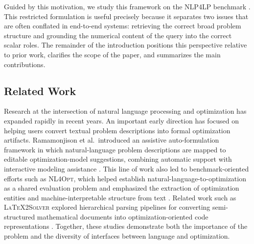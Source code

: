 \documentclass[pdflatex,sn-basic,Numbered]{sn-jnl}
\begin{document}
Guided by this motivation, we study this framework on the \textsc{NLP4LP} benchmark \cite{nlp4lp_dataset,ahmaditeshnizi2024optimus_icml}. This restricted formulation is useful precisely because it separates two issues that are often conflated in end-to-end systems: retrieving the correct broad problem structure and grounding the numerical content of the query into the correct scalar roles. The remainder of the introduction positions this perspective relative to prior work, clarifies the scope of the paper, and summarizes the main contributions.

\subsection{Related Work}
\label{subsec:intro_related}

Research at the intersection of natural language processing and optimization has expanded rapidly in recent years. An important early direction has focused on helping users convert textual problem descriptions into formal optimization artifacts. Ramamonjison et al.\ introduced an assistive auto-formulation framework in which natural-language problem descriptions are mapped to editable optimization-model suggestions, combining automatic support with interactive modeling assistance \cite{ramamonjison2022autoformulation}. This line of work also led to benchmark-oriented efforts such as \textsc{NL4Opt}, which helped establish natural-language-to-optimization as a shared evaluation problem and emphasized the extraction of optimization entities and machine-interpretable structure from text \cite{ramamonjison2023nl4opt}. Related work such as \textsc{LaTeX2Solver} explored hierarchical parsing pipelines for converting semi-structured mathematical documents into optimization-oriented code representations \cite{ramamonjison2023latex2solver}. Together, these studies demonstrate both the importance of the problem and the diversity of interfaces between language and optimization.
\end{document}
